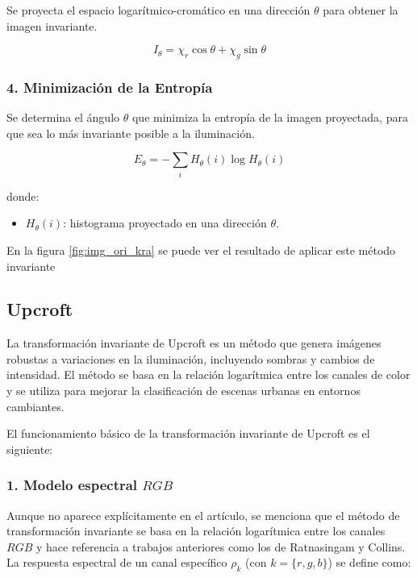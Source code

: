 Se proyecta el espacio logarítmico-cromático en una dirección $\theta$ para obtener la imagen invariante.

$$I_{\theta } =\chi_r \cos \theta +\chi_g \sin \theta$$

\subsubsection{4. Minimización de la Entropía}

Se determina el ángulo $\theta$ que minimiza la entropía de la imagen proyectada, para que sea lo más invariante posible a la iluminación.

$$E_{\theta } =-\sum_i H_{\theta } (i)\log H_{\theta } (i)$$

donde:

\begin{itemize}
\setlength{\itemsep}{-1ex}
   \item{\begin{flushleft} $H_{\theta } (i)$: histograma proyectado en una dirección $\theta$. \end{flushleft}}
\end{itemize}

En la figura \ref{fig:img_ori_kra} se puede ver el resultado de aplicar este método invariante

\subsection{Upcroft}\label{upcroft}

La transformación invariante de Upcroft \cite{upcroft2014} es un método que genera imágenes robustas a variaciones en la iluminación, incluyendo sombras y cambios de intensidad. El método se basa en la relación logarítmica entre los canales de color y se utiliza para mejorar la clasificación de escenas urbanas en entornos cambiantes.

El funcionamiento básico de la transformación invariante de Upcroft es el siguiente:

\subsubsection{1. Modelo espectral $RGB$}

Aunque no aparece explícitamente en el artículo, se menciona que el método de transformación invariante se basa en la relación logarítmica entre los canales $RGB$ y hace referencia a trabajos anteriores como los de Ratnasingam y Collins. La respuesta espectral de un canal específico $\rho_k$ (con $k=\{r,g,b\}$) se define como:

